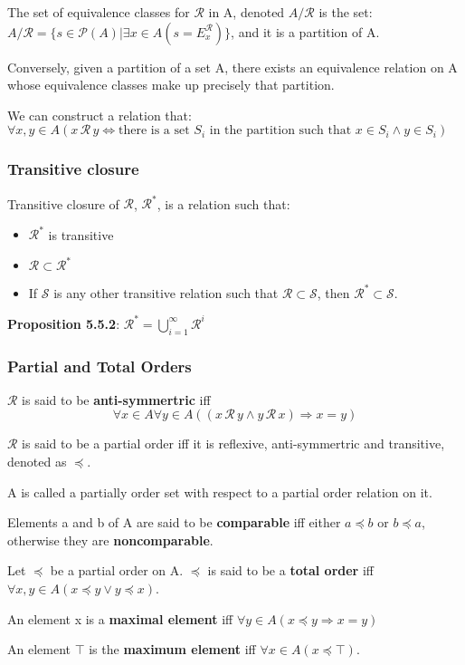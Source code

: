 \documentclass[11pt, twocolumn]{article}
\newenvironment{compactitem}
{\begin{itemize}
  \setlength{\itemsep}{1px}
  \setlength{\parskip}{0pt}
  \setlength{\parsep}{0pt}}
{\end{itemize}}
\begin{document}
The set of equivalence classes for $\mathcal{R}$ in A, denoted $A/\mathcal{R}$ is the set: $A/\mathcal{R}=\{s\in\mathcal{P}(A)|\exists x\in A(s=E_x^\mathcal{R})\}$, and it is a partition of A.

Conversely, given a partition of a set A, there exists an equivalence relation on A whose equivalence classes make up precisely that partition.

We can construct a relation that:
$\forall x,y\in A(x\,\mathcal{R}\,y\Leftrightarrow \text{there is a set }S_i \text{ in the partition such that }x\in S_i\land y\in S_i)$
\subsubsection{Transitive closure}
Transitive closure of $\mathcal{R}$, $\mathcal{R}^*$, is a relation such that:
\begin{compactitem}
\item $\mathcal{R}^*$ is transitive
\item $\mathcal{R}\subset\mathcal{R}^*$
\item If $\mathcal{S}$ is any other transitive relation such that $\mathcal{R}\subset\mathcal{S}$, then $\mathcal{R}^*\subset\mathcal{S}$.
\end{compactitem}
\textbf{Proposition 5.5.2}: $\mathcal{R}^*=\bigcup\limits_{i=1}^\infty\mathcal{R}^i$ 
\subsubsection{Partial and Total Orders}
$\mathcal{R}$ is said to be \textbf{anti-symmertric} iff $$\forall x\in A\forall y\in A((x\,\mathcal{R}\,y\land y\,\mathcal{R}\,x)\Rightarrow x=y)$$

$\mathcal{R}$ is said to be a partial order iff it is reflexive, anti-symmertric and transitive, denoted as $\preceq$.

A is called a partially order set with respect to a partial order relation on it.

Elements a and b of A are said to be \textbf{comparable} iff either $a\preceq b$ or $b\preceq a$, otherwise they are \textbf{noncomparable}.

Let $\preceq$ be a partial order on A. $\preceq$ is said to be a \textbf{total order} iff $\forall x, y\in A(x\preceq y\lor y\preceq x)$.

An element x is a \textbf{maximal element} iff $\forall y\in A(x\preceq y\Rightarrow x=y)$

An element $\top$ is the \textbf{maximum element} iff $\forall x\in A(x\preceq\top)$.
\end{document}
